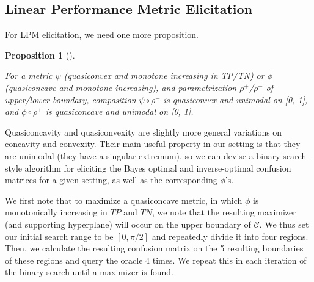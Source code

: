 \documentclass[
  letterpaper,
  numbers=noenddot,
  DIV=11]{scrreprt}
\theoremstyle{plain}
\theoremstyle{definition}
\theoremstyle{plain}
\newtheorem{proposition}{Proposition}[chapter]
\theoremstyle{remark}
\begin{document}
\subsection{Linear Performance Metric Elicitation}\label{sec-orgb6dac4e}

For LPM elicitation, we need one more proposition.

\begin{tcolorbox}[colframe=.grey, title=\faPenSquare \enspace Proposition]

\begin{proposition}[]\protect\hypertarget{prp-prp3.2}{}\label{prp-prp3.2}

For a metric \(\psi\) (quasiconvex and monotone increasing in TP/TN) or
\(\phi\) (quasiconcave and monotone increasing), and parametrization
\(\rho^+\)/\(\rho^-\) of upper/lower boundary, composition
\(\psi \circ \rho^-\) is quasiconvex and unimodal on {[}0, 1{]}, and
\(\phi \circ \rho^+\) is quasiconcave and unimodal on {[}0, 1{]}.

\end{proposition}

\end{tcolorbox}

Quasiconcavity and quasiconvexity are slightly more general variations
on concavity and convexity. Their main useful property in our setting is
that they are unimodal (they have a singular extremum), so we can devise
a binary-search-style algorithm for eliciting the Bayes optimal and
inverse-optimal confusion matrices for a given setting, as well as the
corresponding \(\phi\)'s.

We first note that to maximize a quasiconcave metric, in which \(\phi\)
is monotonically increasing in \(TP\) and \(TN\), we note that the
resulting maximizer (and supporting hyperplane) will occur on the upper
boundary of \(\mathcal{C}\). We thus set our initial search range to be
\([0, \pi/2]\) and repeatedly divide it into four regions. Then, we
calculate the resulting confusion matrix on the 5 resulting boundaries
of these regions and query the oracle \(4\) times. We repeat this in
each iteration of the binary search until a maximizer is found.
\end{document}

